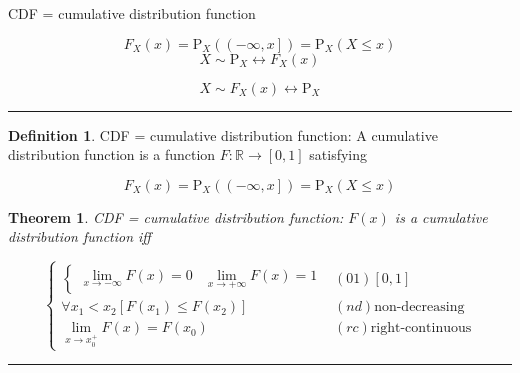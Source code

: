 \documentclass[
]{book}
\newtheorem{theorem}{Theorem}[chapter]
\theoremstyle{definition}
\newtheorem{definition}{Definition}[chapter]
\theoremstyle{definition}
\theoremstyle{definition}
\theoremstyle{definition}
\theoremstyle{remark}
\begin{document}
CDF = cumulative distribution function

\[
F_{{\scriptscriptstyle X}}\left(x\right)=\mathrm{P}_{{\scriptscriptstyle X}}\left(\left(-\infty,x\right]\right)=\mathrm{P}_{{\scriptscriptstyle X}}\left(X\le x\right)
\]
\[
X\sim\mathrm{P}_{{\scriptscriptstyle X}}\leftrightarrow F_{{\scriptscriptstyle X}}\left(x\right)
\]

\[
X\sim F_{{\scriptscriptstyle X}}\left(x\right)\leftrightarrow\mathrm{P}_{{\scriptscriptstyle X}}
\]

\begin{center}\rule{0.5\linewidth}{0.5pt}\end{center}

\begin{definition}
\protect\hypertarget{def:unnamed-chunk-5}{}\label{def:unnamed-chunk-5}CDF = cumulative distribution function: A cumulative distribution function is a function \(F:\mathbb{R} \rightarrow \left[0,1\right]\) satisfying
\end{definition}

\[
F_{{\scriptscriptstyle X}}\left(x\right)=\mathrm{P}_{{\scriptscriptstyle X}}\left(\left(-\infty,x\right]\right)=\mathrm{P}_{{\scriptscriptstyle X}}\left(X\le x\right)
\]

\begin{theorem}
\protect\hypertarget{thm:unnamed-chunk-6}{}\label{thm:unnamed-chunk-6}CDF = cumulative distribution function: \(F\left(x\right)\) is a cumulative distribution function iff
\end{theorem}

\[
\begin{cases}
\begin{cases}
\lim\limits _{x\rightarrow-\infty}F\left(x\right)=0 & \lim\limits _{x\rightarrow+\infty}F\left(x\right)=1\end{cases} & \left(01\right)\left[0,1\right]\\
\forall x_{{\scriptscriptstyle 1}}<x_{{\scriptscriptstyle 2}}\left[F\left(x_{{\scriptscriptstyle 1}}\right)\le F\left(x_{{\scriptscriptstyle 2}}\right)\right] & \left(nd\right)\text{non-decreasing}\\
\lim\limits _{x\rightarrow x_{{\scriptscriptstyle 0}}^{+}}F\left(x\right)=F\left(x_{{\scriptscriptstyle 0}}\right) & \left(rc\right)\text{right-continuous}
\end{cases}
\]

\begin{center}\rule{0.5\linewidth}{0.5pt}\end{center}
\end{document}
